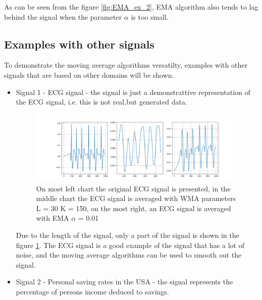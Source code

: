 \documentclass[a4paper,12pt,fleqn]{article}
\begin{document}
            As can be seen from the figure \ref{fig:EMA_ex_2}, EMA algorithm also tends to lag behind the signal when the
            parameter \begin{math}
                \alpha
                \end{math} is too small.
                \newpage
                \subsection{Examples with other signals}

                \hspace{1em} To demonstrate the moving average algorithms versatilty, examples with other
                signals that are based on other domains will be shown. 
                \begin{itemize}
                    \item Signal 1 - ECG signal\cite{ECG} - the signal is just a demonstrattive representation of the ECG signal, i.e. this is not real,but
                    generated data.
                    \begin{figure}[ht]
                        \centering
                        \includegraphics[width=1\textwidth]{images/ECG.png} %
                        \caption{On most left chart the original ECG signal is presented, in the middle chart the ECG signal is averaged with WMA parameters L = 30 K = 150, on the most right, an ECG signal is averaged with EMA $\alpha$ = 0.01}
                        \label{fig:ECG}
                    \end{figure}
                    Due to the length of the signal, only a part of the signal is shown in the figure \ref{fig:ECG}. The ECG signal is a good example of the signal that has a lot of noise, and the moving average algorithms can be used to smooth out the signal.
                    \item Signal 2 - Personal saving rates in the USA\cite{PSAVERT} - the signal represents the percentage of persons income deduced to savings.

\end{itemize}
\end{document}
